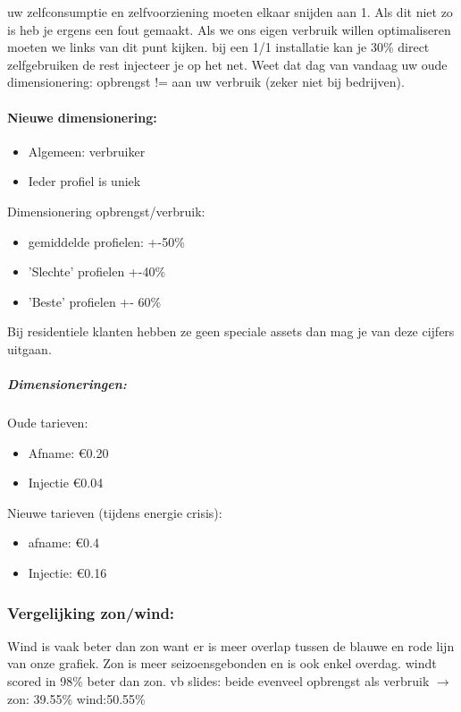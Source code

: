 \documentclass[12pt]{article}
\begin{document}
uw zelfconsumptie en zelfvoorziening moeten elkaar snijden aan 1. Als dit niet zo is heb je ergens een fout gemaakt. Als we ons eigen verbruik willen optimaliseren moeten we links van dit punt kijken. bij een 1/1 installatie kan je 30\% direct zelfgebruiken de rest injecteer je op het net.
Weet dat dag van vandaag uw oude dimensionering: opbrengst != aan uw verbruik (zeker niet bij bedrijven). 
\paragraph{Nieuwe dimensionering:}
\begin{itemize}
    \item Algemeen: verbruiker 
    \item Ieder profiel is uniek
\end{itemize}
Dimensionering opbrengst/verbruik:\begin{itemize}
    \item gemiddelde profielen: +-50\% 
    \item 'Slechte' profielen +-40\%
    \item  'Beste' profielen +- 60\%
\end{itemize}
Bij residentiele klanten hebben ze geen speciale assets dan mag je van deze cijfers uitgaan.\newline 
\subparagraph{Dimensioneringen:}
Oude tarieven:\begin{itemize}
    \item Afname: €0.20
    \item Injectie €0.04
\end{itemize}
Nieuwe tarieven (tijdens energie crisis):\begin{itemize}
    \item afname: €0.4
    \item Injectie: €0.16
\end{itemize}
\subsubsection{Vergelijking zon/wind:}
Wind is vaak beter dan zon want er is meer overlap tussen de blauwe en rode lijn van onze grafiek. Zon is meer seizoensgebonden en is ook enkel overdag. windt scored in 98\% beter dan zon. vb slides: beide evenveel opbrengst als verbruik $\rightarrow$ zon: 39.55\% wind:50.55\%
\end{document}
